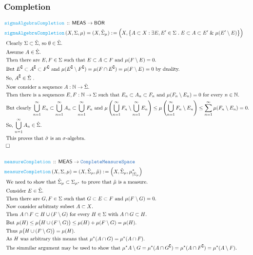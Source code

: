 \documentclass[12pt]{scrartcl}
\newcommand{\TYPE}[1]{\textcolor{NavyBlue}{\mathtt{#1}}}
\newcommand{\FUNC}[1]{\textcolor{Cerulean}{\mathtt{#1}}}
\renewcommand{\.}{\; . \;}
\newcommand{\de}{: \kern 0.1pc =}
\newcommand{\Act}[1]{\left( #1 \right)}
\newcommand{\DeclareFunc}[2]{& \FUNC{#1} \, :: \, #2 \\}
\newcommand{\DefineNamedFunc}[4]{&  \FUNC{#1}\Act{#2} = #3 \de #4 \\}
\newcommand{\Page}[1]{ \begin{align*} #1 \end{align*}   }
\renewcommand{\And}{\; \& \;}
\newcommand{\Nat}{\mathbb{N} }
\renewcommand{\c}{\complement}
\newcommand{\QED}{\; \square}
\newcommand{\EndProof}{& \QED \\}
\newcommand{\Explain}[1]{& \text{#1.} \\}
\newcommand{\BOR}{\mathsf{BOR}}
\newcommand{\CMS}{\TYPE{CompleteMeasureSpace}}
\newcommand{\MEAS}{\mathsf{MEAS}}
\begin{document}
\subsubsection{Completion}
\Page{
	\DeclareFunc{sigmaAlgebraCompletion}{\MEAS \to \BOR}
	\DefineNamedFunc{sigmaAlgebraCompletion}{X,\Sigma,\mu}{(X,\hat \Sigma_\mu)}
	{
		\Big( X, 
			\big\{ 
				A \subset X : \exists E,E' \in \Sigma \. 
				E \subset A \subset E' \And \mu(E'\setminus E) 
			\big\}
		\Big)	
	}
	\Explain{
		Clearly $\Sigma \subset \hat \Sigma$, so $\emptyset \in \hat \Sigma$}
	\Explain{
		Assume $A \in \hat \Sigma$}
	\Explain{
		Then there are $E,F \in \Sigma$ such that $E \subset A \subset F$ and $\mu(F \setminus E) =0$}
	\Explain{
		But $E^\c \subset A^\c \subset F^\c$ and  $\mu(E^\c \setminus F^\c) = \mu(F \cap E^\c) = 
		\mu(F \setminus E) =0$ by duality}
	\Explain{
		So, $A^\c \in \hat \Sigma$
	}
	\Explain{
		Now consider a sequence $A : \Nat \to \hat \Sigma$}
	\Explain{
		Then there is a sequences $E,F : \Nat \to \Sigma$ such that 
		$E_n \subset A_n \subset F_n$ and $\mu(F_n \setminus E_n) = 0$ for every $n \in \Nat$}
	\Explain{
		But clearly $\bigcup^\infty_{n=1} E_n 
			\subset \bigcup^\infty_{n=1} A_n 
			\subset \bigcup^\infty_{n=1} F_n$ and
		$\mu\left(\bigcup^\infty_{n=1} F_n \setminus \bigcup^\infty_{n=1} E_n\right) \le 
			\mu\left( \bigcup^\infty_{n=1} F_n \setminus E_n \right) \le 
			\sum^\infty_{n=1} \mu(F_n \setminus E_n) = 0	$}
	\Explain{
		So, $\bigcup^\infty_{n=1} A_n \in \hat \Sigma$}
	\Explain{ 
		This proves that $\hat \sigma$ is an $\sigma$-algebra}
	\EndProof	
	\\
	\DeclareFunc{measureCompletion}{\MEAS \to \CMS}
	\DefineNamedFunc{measureCompletion}{X,\Sigma,\mu}{(X,\hat \Sigma_\mu,\hat \mu)}
	{
		\Big(X,\hat \Sigma_\mu,  \mu^*_{|\hat \Sigma_\mu} \Big)
	}
	\Explain{
		We need to show that $\hat \Sigma_\mu \subset \Sigma_{\mu^*}$ to prove that $\hat \mu$ is a measure}
	\Explain{
		Consider $E \in \hat \Sigma$}
	\Explain{
		Then there are $G,F \in \Sigma$ such that $G \subset E \subset F$ and  
		$\mu(F \setminus G) = 0$}
	\Explain{ 
		 	Now consider arbitraty subset $A \subset X$}
	\Explain{
		Then $A \cap F \subset H \cup (F \setminus G) $ for every $H\in \Sigma$ with $A \cap G \subset H$}
	\Explain{
		But $\mu(H) \le \mu\big(H \cup (F \setminus G)\big) \le \mu(H) + \mu(F \setminus G) = \mu(H)$}
	\Explain{
		Thus $\mu\big(H \cup (F \setminus G)\big) = \mu(H)$}
	\Explain{
		As $H$ was arbitrary this means that $\mu^*(A \cap G) = \mu^*(A \cap F)$}
	\Explain{
		The simmilar argument may be used to show that 
		$\mu^*{A \setminus G} = \mu^*(A \cap G^\c) = \mu^*(A \cap F^\c) = \mu^*(A \setminus F)$}
}
\end{document}
